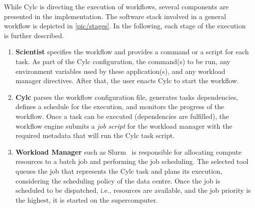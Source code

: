 \documentclass{superfri}
\begin{document}
While Cylc is directing the execution of workflows, several components are presented in the implementation.
The software stack involved in a general workflow is depicted in \cref{pic/stages}.
In the following, each stage of the execution is further described.


\begin{enumerate}

  \item \textbf{Scientist} specifies the workflow and provides a command or a script for each task.
  As part of the Cylc configuration, the command(s) to be run, any environment variables used by these application(s), and any workload manager directives.
  After that, the user enacts Cylc to start the workflow.

  \item \textbf{Cylc} parses the workflow configuration file, generates tasks dependencies, defines a schedule for the execution, and monitors the progress of the workflow.
  Once a task can be executed (dependencies are fulfilled), the workflow engine submits a \textit{job script} for the workload manager with the required metadata that will run the Cylc task script.

  \item \textbf{Workload Manager} such as Slurm~\cite{Jette02slurm:simple} is responsible for allocating compute resources to a batch job and performing the job scheduling.
  The selected tool queues the job that represents the Cylc task and plans its execution, considering the scheduling policy of the data centre.
  Once the job is scheduled to be dispatched, i.e., resources are available, and the job priority is the highest, it is started on the supercomputer.



\end{enumerate}
\end{document}
